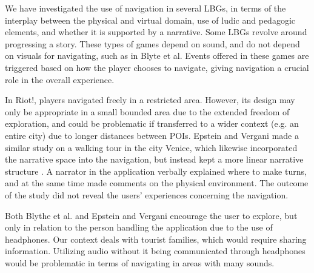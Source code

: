 We have investigated the use of navigation in several LBGs, in terms of the interplay between the physical and virtual domain, use of ludic and pedagogic elements, and whether it is supported by a narrative. Some LBGs revolve around progressing a story. These types of games depend on sound, and do not depend on visuals for navigating, such as in Blyte et al. Events offered in these games are triggered based on how the player chooses to navigate, giving navigation a crucial role in the overall experience.

In Riot!\cite{InterdisciplinaryCriticism}, players navigated freely in a restricted area. However, its design may only be appropriate in a small bounded area due to the extended freedom of exploration, and could be problematic if transferred to a wider context (e.g. an entire city) due to longer distances between POIs. Epstein and Vergani made a similar study on a walking tour in the city Venice, which likewise incorporated the narrative space into the navigation, but instead kept a more linear narrative structure \cite{MobileTechnologies}. A narrator in the application verbally explained where to make turns, and at the same time made comments on the physical environment. The outcome of the study did not reveal the users' experiences concerning the navigation.

Both Blythe et al. and Epstein and Vergani encourage the user to explore, but only in relation to the person handling the application due to the use of headphones. Our context deals with tourist families, which would require sharing information. Utilizing audio without it being communicated through headphones would be problematic in terms of navigating in areas with many sounds. 

